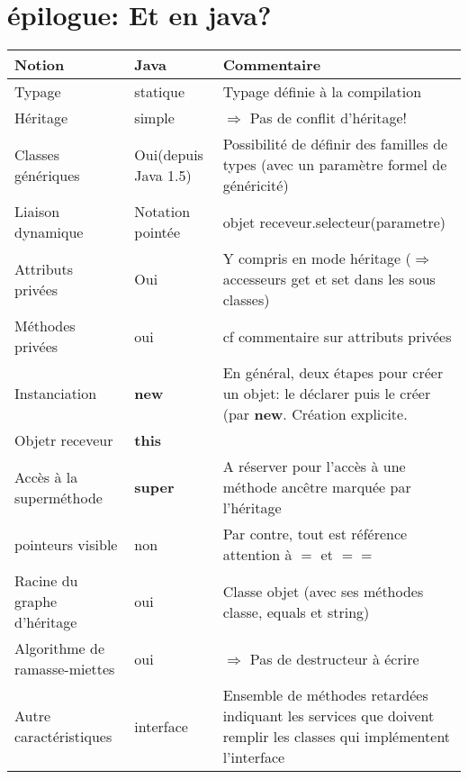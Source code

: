 \documentclass[12pt,a4paper,openany]{report}
\begin{document}
	\maketitle
	
	
	
	\appendix
	\chapter{épilogue: Et en java?}
	\begin{tabular}{|p{4cm}|p{4cm}|p{9cm}|}
		\hline
		\textbf{Notion} & \textbf{Java} & \textbf{Commentaire}\\
		\hline
		Typage & statique & Typage définie à la compilation \\
		\hline
		Héritage & simple & $\Rightarrow$ Pas de conflit d'héritage!\\
		\hline
		Classes génériques & Oui(depuis Java 1.5) & Possibilité de définir des familles de types (avec un paramètre formel de généricité)\\
		\hline
		Liaison dynamique & Notation pointée & objet receveur.selecteur(parametre)\\
		\hline
		Attributs privées & Oui & Y compris en mode héritage ($\Rightarrow$ accesseurs get et set dans les sous classes)\\
		\hline
		Méthodes privées & oui & cf commentaire sur attributs privées \\
		\hline
		Instanciation & \textbf{new} & En général, deux étapes pour créer un objet: le déclarer puis le créer (par \textbf{new}. Création explicite.\\
		\hline
		Objetr receveur  & \textbf{this} & \\
		\hline
		Accès à la superméthode & \textbf{super} & A réserver pour l'accès à une méthode ancêtre marquée par l'héritage \\
		\hline
		pointeurs visible & non & Par contre, tout est référence attention à $=$ et $= =$\\
		\hline	
		Racine du graphe d'héritage & oui & Classe objet (avec ses méthodes classe, equals et string)\\
		\hline 
		Algorithme de ramasse-miettes & oui & $\Rightarrow$ Pas de destructeur à écrire \\
		\hline
		Autre caractéristiques & interface & Ensemble de méthodes retardées indiquant les services que
		doivent remplir les classes qui implémentent l'interface\\
		\hline
	\end{tabular}
\end{document}
